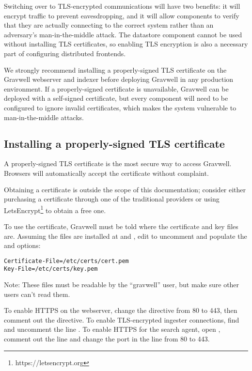 Switching over to TLS-encrypted communications will have two benefits:
it will encrypt traffic to prevent eavesdropping, and it will allow
components to verify that they are actually connecting to the correct
system rather than an adversary's man-in-the-middle attack. The
datastore component cannot be used without installing TLS certificates,
so enabling TLS encryption is also a necessary part of configuring
distributed frontends.

We strongly recommend installing a properly-signed TLS certificate on
the Gravwell webserver and indexer before deploying Gravwell in any
production environment. If a properly-signed certificate is unavailable,
Gravwell can be deployed with a self-signed certificate, but every
component will need to be configured to ignore invalid certificates,
which makes the system vulnerable to man-in-the-middle attacks.

\subsection{Installing a properly-signed TLS certificate}

A properly-signed TLS certificate is the most secure way to access
Gravwell. Browsers will automatically accept the certificate without
complaint.

Obtaining a certificate is outside the scope of this documentation;
consider either purchasing a certificate through one of the traditional
providers or
using LetsEncrypt\footnote{https://letsencrypt.org} to
obtain a free one.

To use the certificate, Gravwell must be told where the certificate and
key files are. Assuming the files are installed at  and
, edit  to uncomment and populate
the  and  options:

\begin{Verbatim}[breaklines=true]
Certificate-File=/etc/certs/cert.pem
Key-File=/etc/certs/key.pem
\end{Verbatim}

Note: These files must be readable by the ``gravwell'' user, but make
sure other users can't read them.

To enable HTTPS on the webserver, change the  directive
from 80 to 443, then comment out the
 directive. To enable TLS-encrypted ingester
connections, find and uncomment the line . To
enable HTTPS for the search agent, open
, comment out the
 line and change the port in the
 line from 80 to 443.

